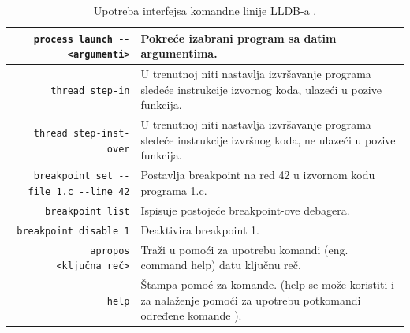 \documentclass[a4paper]{article}
\begin{document}
\begin{table}[h!]
	\begin{center}
		\caption{Upotreba interfejsa komandne linije LLDB-a \cite{lldb_to_gdb_map}\cite{lldb_tutorial}.}
		\small
		\begin{tabular}{|r|p{5cm}|}
			\hline
			\verb|process launch -- <argumenti>|
			& Pokreće izabrani program sa datim argumentima. \\ \hline
			\verb|thread step-in|
			& U trenutnoj niti nastavlja izvršavanje programa sledeće instrukcije izvornog koda, ulazeći u pozive funkcija.  \\ \hline
			\verb|thread step-inst-over|
			& U trenutnoj niti nastavlja izvršavanje programa sledeće instrukcije izvršnog koda, ne ulazeći u pozive funkcija. \\ \hline
			\verb|breakpoint set --file 1.c --line 42|
			& Postavlja breakpoint na red 42 u izvornom kodu programa 1.c. \\ \hline
			\verb|breakpoint list|
			& Ispisuje postojeće breakpoint-ove debagera. \\ \hline
			\verb|breakpoint disable 1|
			& Deaktivira breakpoint 1. \\ \hline
			\verb|apropos <ključna_reč>|
			& Traži u pomoći za upotrebu komandi (eng. command help) datu ključnu reč. \\ \hline
			\verb|help|
			& Štampa pomoć za komande. (help se može koristiti i za nalaženje pomoći za upotrebu potkomandi određene komande \cite{apple_lldb_comms}). \\ \hline
		\end{tabular}
		\label{tab:tabela3}
	\end{center}
\end{table}

\end{document}
